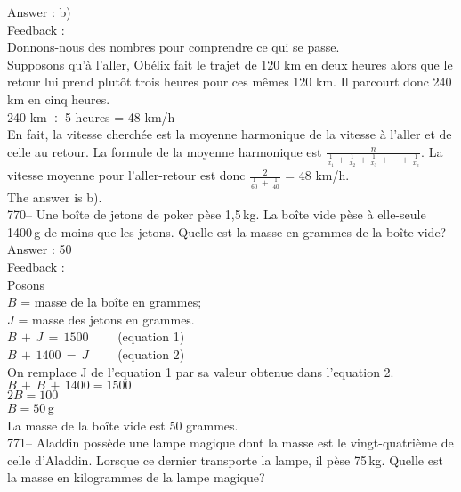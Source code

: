 ﻿\documentclass[letterpaper, 12pt]{article}
\begin{document}
Answer : b)\\

Feedback : \\
Donnons-nous des nombres pour comprendre ce qui se passe.  \\
Supposons qu'\`a l'aller, Ob\'elix fait le trajet de 120 km en deux heures
alors que le retour lui prend plut\^ot trois heures pour ces m\^emes 120 km.
Il parcourt donc 240 km en cinq heures.  \\
240 km $\div$ 5 heures = 48 km/h\\

En fait, la vitesse cherch\'ee est la moyenne harmonique de la vitesse \`a
l'aller et de celle au retour.  La formule de la moyenne harmonique est
$\frac{n}{\frac{1}{x_1}\,+\,\frac{1}{x_2}\,+\,\frac{1}{x_3}\,+\,\cdots\,+\,\frac{1}{x_n}}$.
La vitesse moyenne pour l'aller-retour est donc
$\frac{2}{\frac{1}{60}\,+\,\frac{1}{40}}$ = 48 km/h.\\
The answer is b).\\

770-- Une bo\^ite de jetons de poker p\`ese 1,5\,kg.  La bo\^ite vide p\`ese
\`a elle-seule 1400\,g de moins que les jetons.  Quelle est la masse en
grammes de la bo\^ite vide?\\

Answer : 50\\

Feedback : \\
Posons\\
$B$ = masse de la bo\^ite en grammes; \\
$J$ = masse des jetons en grammes. \\

$B\,+\,J\,=\,1500 \qquad$ (equation 1)\\
$B\,+\,1400\,=\,J \qquad$ (equation 2)\\

On remplace J de l'equation 1 par sa valeur obtenue dans l'equation 2.
\\
$B\,+\,B\,+\,1400=1500$\\
$2B=100$\\
$B=50$\,g\\
La masse de la bo\^ite vide est 50 grammes.\\

771-- Aladdin poss\`ede une lampe magique dont la masse est le
vingt-quatri\`eme de celle d'Aladdin.  Lorsque ce dernier transporte la
lampe, il p\`ese 75\,kg.  Quelle est la masse en kilogrammes de la lampe
magique?\\
\end{document}
